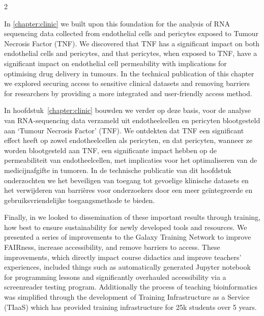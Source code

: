 \begin{paracol}{2}
\switchcolumn*

In \cref{chapter:clinic} we built upon this foundation for the analysis of RNA sequencing data collected from endothelial cells and pericytes exposed to Tumour Necrosis Factor (TNF).
We discovered that TNF has a significant impact on both endothelial cells and pericytes, and that pericytes, when exposed to TNF, have a significant impact on endothelial cell permeability with implications for optimising drug delivery in tumours.
In the technical publication of this chapter we explored securing access to sensitive clinical datasets and removing barriers for researchers by providing a more integrated and user-friendly access method.

\switchcolumn

In hoofdstuk~\ref{chapter:clinic} bouwden we verder op deze basis, voor de analyse van RNA-sequencing data verzameld uit endotheelcellen en pericyten blootgesteld aan `Tumour Necrosis Factor' (TNF).
We ontdekten dat TNF een significant effect heeft op zowel endotheelcellen als pericyten, en dat pericyten, wanneer ze worden blootgesteld aan TNF, een significante impact hebben op de permeabiliteit van endotheelcellen, met implicaties voor het optimaliseren van de medicijnafgifte in tumoren.
In de technische publicatie van dit hoofdstuk onderzochten we het beveiligen van toegang tot gevoelige klinische datasets en het verwijderen van barrières voor onderzoekers door een meer geïntegreerde en gebruiksvriendelijke toegangsmethode te bieden.

\switchcolumn*

Finally, in  we looked to dissemination of these important results through training, how best to ensure sustainability for newly developed tools and resources.
We presented a series of improvements to the Galaxy Training Network to improve FAIRness, increase accessibility, and remove barriers to access.
These improvements, which directly impact course didactics and improve teachers' experiences, included things such as automatically generated Jupyter notebook for programming lessons and significantly overhauled accessibility via a screenreader testing program.
Additionally the process of teaching bioinformatics was simplified through the development of Training Infrastructure as a Service (TIaaS) which has provided training infrastructure for 25k students over 5 years.

\switchcolumn


\end{paracol}
